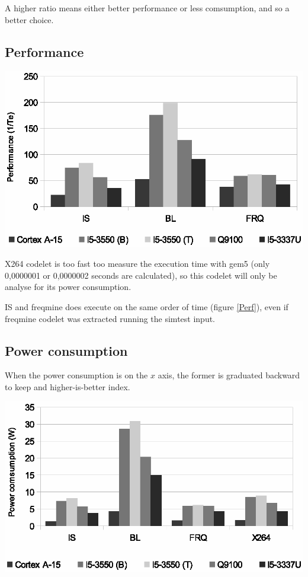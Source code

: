 \documentclass{article}
\newenvironment{Figure}
  {\par\medskip\noindent\center\minipage{0.9\linewidth}}
  {\endminipage\par\bigskip\medskip}
\begin{document}
\begin{multicols}{2}
A higher ratio means either better performance or less comsumption, and so a better choice.

\newpage

\subsection{Performance}
\begin{Figure}
\centering
\includegraphics[width=\linewidth]{Performance.eps}
\end{Figure}


X264 codelet is too fast too measure the execution time with gem5 (only 0,0000001 or 0,0000002 seconds are calculated), so this codelet will only be analyse for its power consumption.


IS and freqmine does execute on the same order of time (figure \ref{Perf}), even if freqmine codelet was extracted running the simtest input. 



\subsection{Power consumption}
When the power consumption is on the $x$ axis, the former is graduated backward to keep and higher-is-better index.


\begin{Figure}
\centering
\includegraphics[width=\linewidth]{Power_consumption.eps}
\end{Figure}


\end{multicols}
\end{document}
